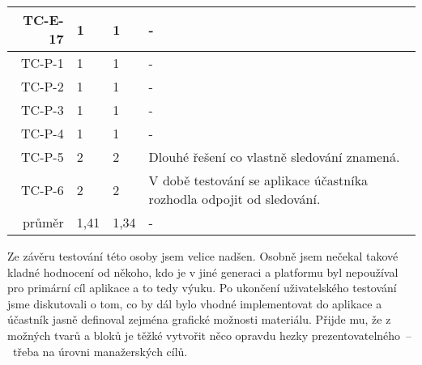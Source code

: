 \begin{longtable}{r|p{2cm}|p{2cm}|p{6cm}}
TC-E-17  & 1 & 1 & - \\\hline
TC-P-1   & 1 & 1 & - \\\hline
TC-P-2   & 1 & 1 & - \\\hline
TC-P-3   & 1 & 1 & - \\\hline
TC-P-4   & 1 & 1 & - \\\hline
TC-P-5   & 2 & 2 & Dlouhé řešení co vlastně sledování znamená. \\\hline
TC-P-6   & 2 & 2 & V době testování se aplikace účastníka rozhodla odpojit od sledování. \\\hline\hline
průměr   & 1,41 & 1,34 & - \\
\end{longtable}

Ze závěru testování této osoby jsem velice nadšen.
Osobně jsem nečekal takové kladné hodnocení od někoho, kdo je v jiné generaci a platformu byl nepoužíval pro primární cíl aplikace a to tedy výuku.
Po ukončení uživatelského testování jsme diskutovali o tom, co by dál bylo vhodné implementovat do aplikace a účastník jasně definoval zejména grafické možnosti materiálu.
Přijde mu, že z možných tvarů a bloků je těžké vytvořit něco opravdu hezky prezentovatelného~--~třeba na úrovni manažerských cílů.



